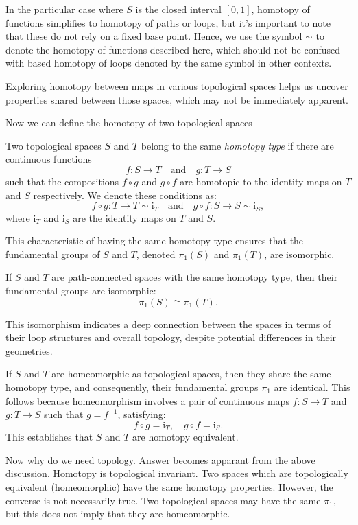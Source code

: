 \documentclass{article}
\begin{document}
In the particular case where \(S\) is the closed interval \([0, 1]\), homotopy of functions simplifies to homotopy of paths or loops, but it's important to note that these do not rely on a fixed base point. Hence, we use the symbol \(\sim\) to denote the homotopy of functions described here, which should not be confused with based homotopy of loops denoted by the same symbol in other contexts.

Exploring homotopy between maps in various topological spaces helps us uncover properties shared between those spaces, which may not be immediately apparent.

Now we can define the homotopy of two topological spaces 

\begin{theorem}
Two topological spaces \( S \) and \( T \) belong to the same \textit{homotopy type} if there are continuous functions 
\[
f: S \rightarrow T \quad \text{and} \quad g: T \rightarrow S
\]
such that the compositions \( f \circ g \) and \( g \circ f \) are homotopic to the identity maps on \( T \) and \( S \) respectively. We denote these conditions as:
\[
f \circ g: T \to T \sim \text{i}_T \quad \text{and} \quad g \circ f: S \to S \sim \text{i}_S,
\]
where \( \text{i}_T \) and \( \text{i}_S \) are the identity maps on \( T \) and \( S \).

\end{theorem}

This characteristic of having the same homotopy type ensures that the fundamental groups of \( S \) and \( T \), denoted \( \pi_1(S) \) and \( \pi_1(T) \), are isomorphic. 

\begin{theorem}
If \( S \) and \( T \) are path-connected spaces with the same homotopy type, then their fundamental groups are isomorphic:
\[
\pi_1(S) \cong \pi_1(T).
\]    
\end{theorem}

This isomorphism indicates a deep connection between the spaces in terms of their loop structures and overall topology, despite potential differences in their geometries.

\begin{theorem}
If \( S \) and \( T \) are homeomorphic as topological spaces, then they share the same homotopy type, and consequently, their fundamental groups \( \pi_1 \) are identical. This follows because homeomorphism involves a pair of continuous maps \( f: S \to T \) and \( g: T \to S \) such that \( g = f^{-1} \), satisfying:
\[
f \circ g = \text{i}_T, \quad g \circ f = \text{i}_S.
\]
This establishes that \( S \) and \( T \) are homotopy equivalent.    
\end{theorem}
Now why do we need topology. Answer becomes apparant from the above discussion. Homotopy is topological invariant. Two spaces which are topologically equivalent (homeomorphic) have the same homotopy properties. However, the converse is not necessarily true. Two topological spaces may have the same \( \pi_1 \), but this does not imply that they are homeomorphic. 
\end{document}
